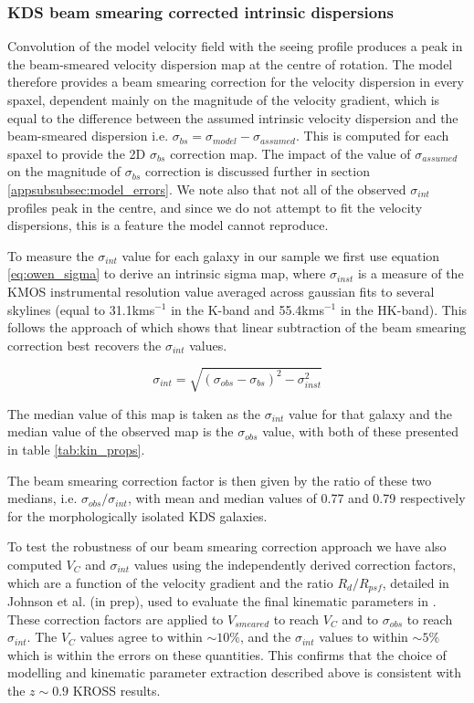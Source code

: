 \documentclass[fleqn,usenatbib]{mn2e}
\begin{document}
\subsubsection{KDS beam smearing corrected intrinsic dispersions}\label{subsubsec:beam_smearing_corrected_dispersions}
Convolution of the model velocity field with the seeing profile produces a peak in the beam-smeared velocity dispersion map at the centre of rotation.
The model therefore provides a beam smearing correction for the velocity dispersion in every spaxel, dependent mainly on the magnitude of the velocity gradient, which is equal to the difference between the assumed intrinsic velocity dispersion and the beam-smeared dispersion i.e. $\sigma_{bs} = \sigma_{model} - \sigma_{assumed}$.
This is computed for each spaxel to provide the 2D $\sigma_{bs}$ correction map.
The impact of the value of $\sigma_{assumed}$ on the magnitude of $\sigma_{bs}$ correction is discussed further in section \cref{appsubsubsec:model_errors}.
We note also that not all of the observed $\sigma_{int}$ profiles peak in the centre, and since we do not attempt to fit the velocity dispersions, this is a feature the model cannot reproduce. 

To measure the $\sigma_{int}$ value for each galaxy in our sample we first use equation \ref{eq:owen_sigma} to derive an intrinsic sigma map, where $\sigma_{inst}$ is a measure of the KMOS instrumental resolution value averaged across gaussian fits to several skylines (equal to 31.1kms$^{-1}$ in the K-band and 55.4kms$^{-1}$ in the HK-band).
This follows the approach of \cite{Stott2016} which shows that linear subtraction of the beam smearing correction best recovers the $\sigma_{int}$ values. 

\begin{equation}\label{eq:owen_sigma}
   \sigma_{int} = \sqrt{\left(\sigma_{obs} - \sigma_{bs} \right)^{2} - \sigma_{inst}^{2}}
\end{equation}

The median value of this map is taken as the $\sigma_{int}$ value for that galaxy and the median value of the observed map is the $\sigma_{obs}$ value, with both of these presented in table \ref{tab:kin_props}.

The beam smearing correction factor is then given by the ratio of these two medians, i.e. $\sigma_{obs}/\sigma_{int}$, with mean and median values of 0.77 and 0.79 respectively for the morphologically isolated KDS galaxies.


To test the robustness of our beam smearing correction approach we have also computed $V_{C}$ and $\sigma_{int}$ values using the independently derived correction factors, which are a function of the velocity gradient and the ratio $R_{d}/R_{psf}$, detailed in Johnson et al. (in prep), used to evaluate the final kinematic parameters in \cite{Harrison2017}.
These correction factors are applied to $V_{smeared}$ to reach $V_{C}$ and to $\sigma_{obs}$ to reach $\sigma_{int}$.
The $V_{C}$ values agree to within $\sim10\%$, and the $\sigma_{int}$ values to within $\sim5\%$ which is within the errors on these quantities. 
This confirms that the choice of modelling and kinematic parameter extraction described above is consistent with the $z\sim0.9$ KROSS results.
\end{document}
